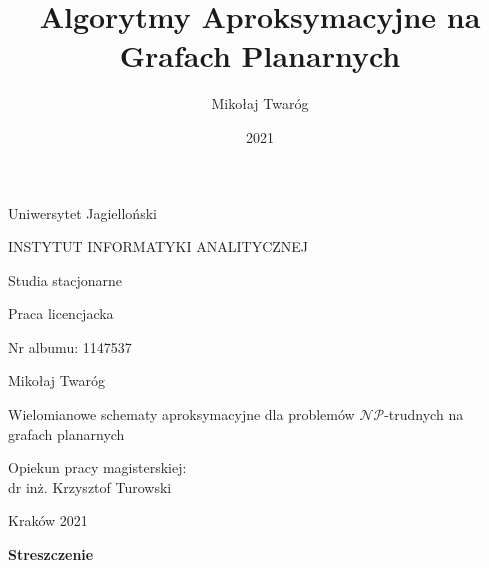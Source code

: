 \documentclass[twoside,a4paper,12pt]{report} %
\title{Algorytmy Aproksymacyjne na Grafach Planarnych}
\author{Mikołaj Twaróg}
\date{2021}
\theoremstyle{break}
\begin{document}
\titleformat{\chapter}[display] {\normalfont\Huge\bfseries}{\chaptertitlename\ \thechapter}{0pt}{\Huge}
\titlespacing{\chapter}{1cm}{2cm}{1cm}

\thispagestyle{empty}
\begin{center}{\sc \large
Uniwersytet Jagielloński\par\vspace{0.2cm}\par}
{\LARGE
INSTYTUT INFORMATYKI ANALITYCZNEJ}\par\vspace{0.2cm}\par
{\large
Studia stacjonarne}\par\vspace{1cm}\par
{\Large
Praca licencjacka}%
\end{center}
\vspace{1.5cm}
\begin{flushleft}
{\large
Nr albumu: 1147537}%
\end{flushleft}
\vspace{1.5cm}
\begin{center}
{\LARGE
Mikołaj Twaróg
}\par\vspace{0.9cm}\par
{\huge
Wielomianowe schematy aproksymacyjne dla problemów $\mathcal{NP}$-trudnych na grafach planarnych
}
\end{center}
\vspace{4cm}
\begin{flushright}

Opiekun pracy magisterskiej:\\
dr inż. Krzysztof Turowski%
\end{flushright}
\vfill
\begin{center}
Kraków 2021%
\end{center}


\leavevmode\thispagestyle{empty}\newpage
\centerline{\LARGE \bf Streszczenie}\par\vspace{1cm}\par
\end{document}
